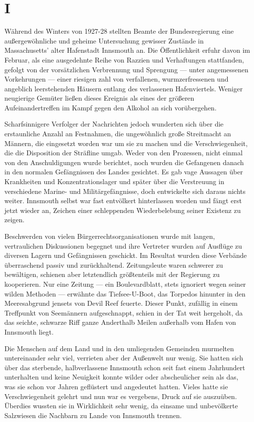 \chapter*{I}

Während des Winters von 1927-28 stellten Beamte der Bundesregierung eine außergewöhnliche und geheime Untersuchung gewisser Zustände in Massachusetts' alter Hafenstadt Innsmouth an. Die Öffentlichkeit erfuhr davon im Februar, als eine ausgedehnte Reihe von Razzien und Verhaftungen stattfanden, gefolgt von der vorsätzlichen Verbrennung und Sprengung --- unter angemessenen Vorkehrungen --- einer riesigen zahl von verfallenen, wurmzerfressenen und angeblich leerstehenden Häusern entlang des verlassenen Hafenviertels. Weniger neugierige Gemüter ließen dieses Ereignis als eines der größeren Aufeinandertreffen im Kampf gegen den Alkohol an sich vorübergehen.

Scharfsinnigere Verfolger der Nachrichten jedoch wunderten sich über die erstaunliche Anzahl an Festnahmen, die ungewöhnlich große Streitmacht an Männern, die eingesetzt worden war um sie zu machen und die Verschwiegenheit, die die Disposition der Sträfline umgab. Weder von den Prozessen, nicht einmal von den Anschuldigungen wurde berichtet, noch wurden die Gefangenen danach in den normalen Gefängnissen des Landes gesichtet. Es gab vage Aussagen über Krankheiten und Konzentrationslager und später über die Verstreuung in verschiedene Marine- und Militärgefängnisse, doch entwickelte sich daraus nichts weiter. Innsmouth selbst war fast entvölkert hinterlassen worden und fängt erst jetzt wieder an, Zeichen einer schleppenden Wiederbelebung seiner Existenz zu zeigen.

Beschwerden von vielen Bürgerrechtsorganisationen wurde mit langen, vertraulichen Diskussionen begegnet und ihre Vertreter wurden auf Ausflüge zu diversen Lagern und Gefängnissen geschickt. Im Resultat wurden diese Verbände überraschend passiv und zurückhaltend. Zeitungsleute waren schwerer zu bewältigen, schienen aber letztendlich größtenteils mit der Regierung zu kooperieren. Nur eine Zeitung --- ein Boulevardblatt, stets ignoriert wegen seiner wilden Methoden --- erwähnte das Tiefsee-U-Boot, das Torpedos hinunter in den Meeresabgrund jensets von Devil Reef feuerte. Dieser Punkt, zufällig in einem Treffpunkt von Seemännern aufgeschnappt, schien in der Tat weit hergeholt, da das seichte, schwarze Riff ganze Anderthalb Meilen außerhalb vom Hafen von Innsmouth liegt.

Die Menschen auf dem Land und in den umliegenden Gemeinden murmelten untereinander sehr viel, verrieten aber der Außenwelt nur wenig. Sie hatten sich über das sterbende, halbverlassene Innsmouth schon seit fast einem Jahrhundert unterhalten und keine Neuigkeit konnte wilder oder abscheulicher sein als das, was sie schon vor Jahren geflüstert und angedeutet hatten.
Vieles hatte sie Verschwiegenheit gelehrt und nun war es vergebens, Druck auf sie auszuüben. Überdies wussten sie in Wirklichkeit sehr wenig, da einsame und unbevölkerte Salzwiesen die Nachbarn zu Lande von Innsmouth trennen.

